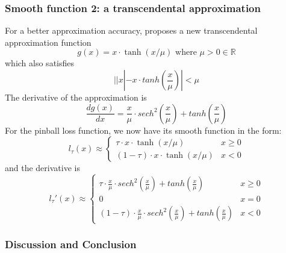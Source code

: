 \subsubsection{Smooth function 2: a transcendental approximation}
\label{subsec: smooth_new}

For a better approximation accuracy, \citeauthor{bagulSMOOTHTRANSCENDENTALAPPROXIMATION2017}\cite{bagulSMOOTHTRANSCENDENTALAPPROXIMATION2017} proposes a new transcendental approximation function 
 \begin{equation}
    g(x) = x \cdot \tanh(x/\mu) \text{  where } \mu > 0 \in \mathbb{R}
 \end{equation}
which also satisfies
\begin{equation}
    ||x| - x \cdot tanh(\frac{x}{\mu})| < \mu
\end{equation}
The derivative of the approximation is
\begin{equation}
    \frac{dg(x)}{dx} = \frac{x}{\mu} \cdot sech^2 (\frac{x}{\mu}) + tanh(\frac{x}{\mu})
\end{equation}
For the pinball loss function, we now have its smooth function in the form:
\begin{equation}
    l_\tau(x) \approx 
    \begin{cases}
        \tau \cdot x \cdot \tanh(x/\mu) & {x\geq 0}\\
        (1-\tau) \cdot x \cdot \tanh(x/\mu) & {x < 0}
    \end{cases}
\end{equation}
and the derivative is
\begin{equation}
\label{eq:smooth_new_d}
    l_\tau\prime(x) \approx 
    \begin{cases}
        \tau \cdot \frac{x}{\mu} \cdot sech^2 (\frac{x}{\mu}) + tanh(\frac{x}{\mu}) & {x\geq 0}\\
        0 & {x=0}\\
        (1-\tau) \cdot \frac{x}{\mu} \cdot sech^2 (\frac{x}{\mu}) + tanh(\frac{x}{\mu}) & {x < 0}
    \end{cases}
\end{equation}
\subsubsection{Discussion and Conclusion}


